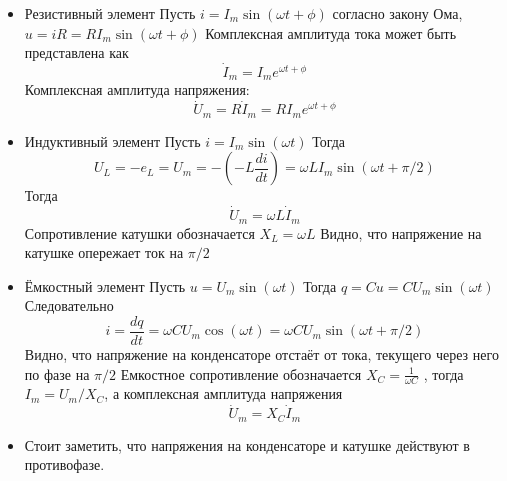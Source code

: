 \begin{itemize}

\item Резистивный элемент
Пусть $i = I_{m}\sin(\omega t + \phi)$ согласно закону Ома, $u = iR = RI_{m}\sin(\omega t + \phi)$
Комплексная амплитуда тока может быть представлена как 
$$ \dot I_m = I_m e^{\omega t + \phi} $$
Комплексная амплитуда напряжения:
$$ \dot U_m = R\dot I_m = RI_m e^{\omega t + \phi}
$$
\item Индуктивный элемент
Пусть $i = I_{m}\sin(\omega t )$
Тогда $$ U_{L} = -e_{L} = U_{m} = -(-L\frac{di}{dt}) = \omega LI_{m}\sin(\omega t + \pi/2)$$
Тогда 
$$
\dot U_m = \omega L\dot I_m 
$$
Сопротивление катушки обозначается $X_L = \omega L$ Видно, что напряжение на катушке опережает ток на $\pi/2$
\item Ёмкостный элемент
Пусть $u = U_m\sin(\omega t)$
Тогда $q = Cu = CU_m\sin(\omega t)$
Следовательно
$$
i = \frac{dq}{dt} = \omega CU_m\cos(\omega t ) = \omega CU_m\sin(\omega t + \pi/2)
$$
Видно, что напряжение на конденсаторе отстаёт от тока, текущего через него по фазе на $\pi/2$ 
Емкостное сопротивление обозначается $X_C = \frac{1}{\omega C}$ , тогда $I_m = U_m/X_C$, а комплексная амплитуда напряжения
$$
\dot U_m = X_C \dot I_m
$$

\item Стоит заметить, что напряжения на конденсаторе и катушке действуют в противофазе.

\end{itemize}

\pagebreak